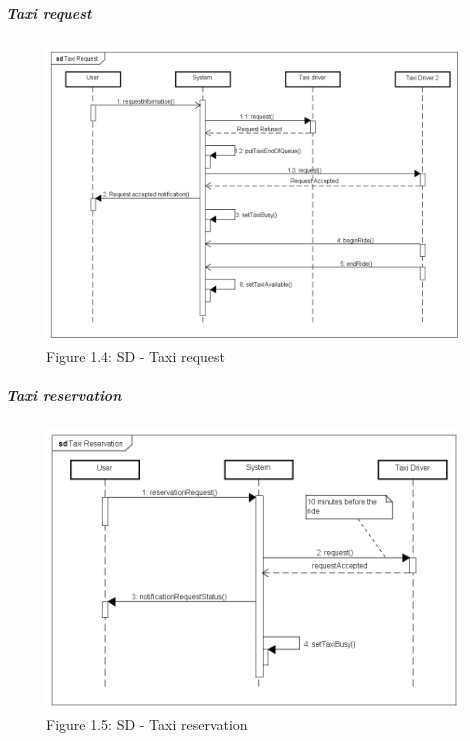 \newpage
\subparagraph{Taxi request}
\noindent
    \begin{figure}[h]
        \includegraphics[width=11cm]{./Diagrams/TaxiRequest.png}
        \newline Figure 1.4: SD - Taxi request
        \centering
    \end{figure}
\newpage
\subparagraph{Taxi reservation}
\noindent
    \begin{figure}[h]
        \includegraphics[width=11cm]{./Diagrams/TaxiReservation.png}
        \newline Figure 1.5: SD - Taxi reservation
        \centering
    \end{figure}

